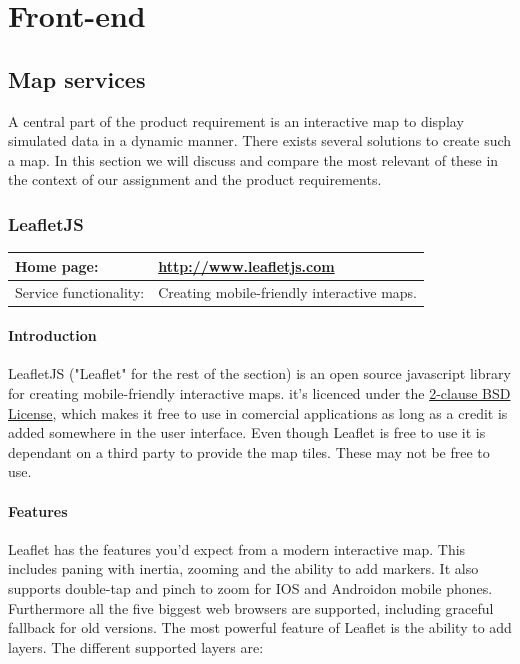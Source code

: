 \documentclass[11pt,a4paper,titlepage,oneside]{report}
\begin{document}
\section{Front-end}

  \subsection{Map services}

  A central part of the product requirement is an interactive map to display simulated data in a dynamic manner. There exists several solutions to create such a map. In this section we will discuss and compare the most relevant of these in the context of our assignment and the product requirements.

  \subsubsection{LeafletJS}
  \begin{tabular}{|p{4cm}|p{8cm}|}
    \hline
    Home page: & \url{http://www.leafletjs.com} \\
    \hline
    Service functionality: & Creating mobile-friendly interactive maps. \\
    \hline
  \end{tabular}
  
  \paragraph{Introduction} \indent
  LeafletJS ("Leaflet" for the rest of the section) is an open source javascript library for creating mobile-friendly interactive maps. it's licenced under the \href{'https://github.com/Leaflet/Leaflet/blob/master/LICENSE'}{2-clause BSD License}, which makes it free to use in comercial applications as long as a credit is added somewhere in the user interface.
  Even though Leaflet is free to use it is dependant on a third party to provide the map tiles. These may not be free to use.

  \paragraph{Features}
  Leaflet has the features you'd expect from a modern interactive map. This includes paning with inertia, zooming and the ability to add markers. It also supports double-tap and pinch to zoom for IOS and Androidon mobile phones. Furthermore all the five biggest web browsers are supported, including graceful fallback for old versions.
  The most powerful feature of Leaflet is the ability to add layers. 
  \newline The different supported layers are:
\end{document}
